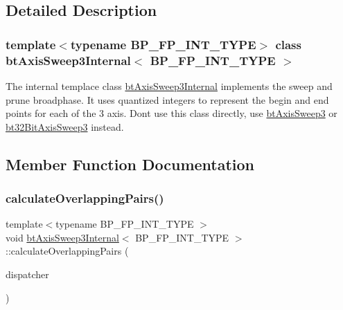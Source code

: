 \subsection{Detailed Description}
\subsubsection*{template$<$typename B\+P\+\_\+\+F\+P\+\_\+\+I\+N\+T\+\_\+\+T\+Y\+PE$>$\newline
class bt\+Axis\+Sweep3\+Internal$<$ B\+P\+\_\+\+F\+P\+\_\+\+I\+N\+T\+\_\+\+T\+Y\+P\+E $>$}

The internal templace class \hyperlink{classbtAxisSweep3Internal}{bt\+Axis\+Sweep3\+Internal} implements the sweep and prune broadphase. It uses quantized integers to represent the begin and end points for each of the 3 axis. Dont use this class directly, use \hyperlink{classbtAxisSweep3}{bt\+Axis\+Sweep3} or \hyperlink{classbt32BitAxisSweep3}{bt32\+Bit\+Axis\+Sweep3} instead. 

\subsection{Member Function Documentation}
\mbox{\label{classbtAxisSweep3Internal_ab89835d4ecb51e2dadc7e3b6e7c29adb}} 
\subsubsection{\texorpdfstring{calculate\+Overlapping\+Pairs()}{calculateOverlappingPairs()}}
{\footnotesize\ttfamily template$<$typename B\+P\+\_\+\+F\+P\+\_\+\+I\+N\+T\+\_\+\+T\+Y\+PE $>$ \\
void \hyperlink{classbtAxisSweep3Internal}{bt\+Axis\+Sweep3\+Internal}$<$ B\+P\+\_\+\+F\+P\+\_\+\+I\+N\+T\+\_\+\+T\+Y\+PE $>$\+::calculate\+Overlapping\+Pairs (\begin{DoxyParamCaption}\item[{\hyperlink{classbtDispatcher}{bt\+Dispatcher} $\ast$}]{dispatcher }\end{DoxyParamCaption})\hspace{0.3cm}{\ttfamily [virtual]}}



